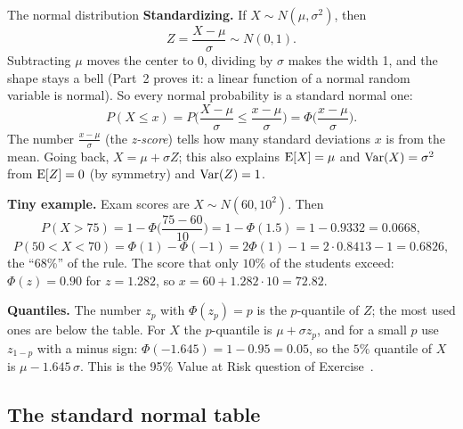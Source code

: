 \begin{key}{The normal distribution}
	\textbf{Standardizing.} If $X\sim N(\mu,\sigma^2)$, then
	\[ Z=\frac{X-\mu}{\sigma}\sim N(0,1). \]
	Subtracting $\mu$ moves the center to 0, dividing by $\sigma$ makes the
	width 1, and the shape stays a bell (Part~2 proves it: a linear function
	of a normal random variable is normal). So every normal probability is a
	standard normal one:
	\[ P(X\le x)=P\Big(\frac{X-\mu}{\sigma}\le\frac{x-\mu}{\sigma}\Big)
		=\Phi\Big(\frac{x-\mu}{\sigma}\Big). \]
	The number $\frac{x-\mu}{\sigma}$ (the \emph{z-score}) tells how many
	standard deviations $x$ is from the mean. Going back, $X=\mu+\sigma Z$;
	this also explains $\operatorname{E}[X]=\mu$ and $\operatorname{Var}(X)=\sigma^2$ from $\operatorname{E}[Z]=0$ (by
	symmetry) and $\operatorname{Var}(Z)=1$.

	\textbf{Tiny example.} Exam scores are $X\sim N(60,10^2)$. Then
	\[ P(X>75)=1-\Phi\Big(\frac{75-60}{10}\Big)=1-\Phi(1.5)=1-0.9332=0.0668, \]
	\[ P(50<X<70)=\Phi(1)-\Phi(-1)=2\Phi(1)-1=2\cdot0.8413-1=0.6826, \]
	the ``68\%'' of the rule. The score that only $10\%$ of the students
	exceed: $\Phi(z)=0.90$ for $z=1.282$, so $x=60+1.282\cdot10=72.82$.

	\textbf{Quantiles.} The number $z_p$ with $\Phi(z_p)=p$ is the
	$p$-quantile of $Z$; the most used ones are below the table. For $X$ the
	$p$-quantile is $\mu+\sigma z_p$, and for a small $p$ use
	$z_{1-p}$ with a minus sign: $\Phi(-1.645)=1-0.95=0.05$, so the $5\%$
	quantile of $X$ is $\mu-1.645\,\sigma$. This is the 95\% Value at Risk
	question of Exercise~.
\end{key}


\clearpage
\subsection*{The standard normal table}

